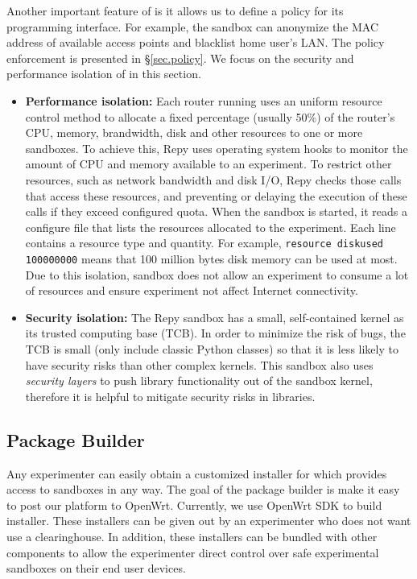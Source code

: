 Another important feature of \sandboxname is it allows us to define a policy for its programming interface. For example, the sandbox can anonymize the MAC address of available access points and blacklist home user's LAN. The policy enforcement is presented in \S{\ref{sec.policy}}. We focus on the security and performance isolation of \sandboxname in this section.
\begin{itemize}
\item \textbf{Performance isolation: }Each router running \sysname uses an uniform
 resource control method to allocate a fixed percentage (usually 50\%) of the
 router's CPU, memory, brandwidth, disk and other resources to one or more sandboxes.
 To achieve this, Repy uses operating system hooks to monitor the amount of CPU
  and memory available to an experiment. To restrict other resources, such as
  network bandwidth and disk I/O, Repy checks those calls that access these resources,
 and preventing or delaying the execution of these calls if they exceed configured
 quota. When the sandbox is started, it reads a configure file that lists the resources
  allocated to the experiment. Each line contains a resource type and quantity.
   For example, \texttt{resource diskused 100000000} means that 100 million bytes
   disk memory can be used at most. Due to this isolation, sandbox does not allow an experiment to consume a lot of resources and ensure experiment not affect Internet connectivity.

\item \textbf{Security isolation: } The Repy sandbox has a small, self-contained kernel as its trusted computing base (TCB). In order to minimize the risk of bugs, the TCB is small (only include classic Python classes) so that it is less likely to have security risks than other complex kernels. This sandbox also uses \textit{security layers} to push library functionality out of the sandbox kernel, therefore it is helpful to mitigate security risks in libraries.

\end{itemize}
\subsection{Package Builder}
\label{sec.packagebuilder}
Any experimenter can easily obtain a customized installer for \sysname which provides
 access to sandboxes in any way. The goal of the package builder is make it easy
  to post our platform to OpenWrt. Currently, we use OpenWrt SDK to build installer. These installers can be given out by an experimenter who does not want use a clearinghouse. In addition, these installers can be bundled with other components to allow the experimenter direct control over safe experimental sandboxes on their end user devices.

